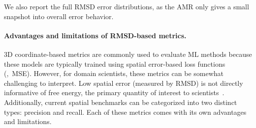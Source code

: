 We also report the full RMSD error distributions, as the AMR only gives a small snapshot into overall error behavior.


\paragraph{Advantages and limitations of RMSD-based metrics.}
3D coordinate-based metrics are commonly used to evaluate ML methods because these models are typically trained using spatial error-based loss functions (\ie,\ MSE). However, for domain scientists, these metrics can be somewhat challenging to interpret. Low spatial error (measured by RMSD) is not directly informative of free energy, the primary quantity of interest to scientists~\citep{blau, blau2}.
Additionally, current spatial benchmarks can be categorized into two distinct types: precision and recall. Each of these metrics comes with its own advantages and limitations.

